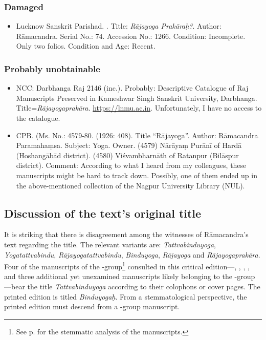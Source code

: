 \subsubsection{Damaged}
\begin{itemize}
\item Lucknow Sanskrit Parishad. . Title: \emph{Rājayoga Prakāraḥ?}. Author: Rāmacandra. Serial No.: 74. Accession No.: 1266. Condition: Incomplete. Only two folios. Condition and Age: Recent. 
\end{itemize}

\subsubsection{Probably unobtainable}
\begin{itemize}  
\item NCC: Darbhanga Raj 2146 (inc.). Probably: Descriptive Catalogue of Raj Manuscripts Preserved in Kameshwar Singh Sanskrit University, Darbhanga. Title=\emph{Rājayogaprakāra}. \url{https://lnmu.ac.in}. Unfortunately, I have no access to the catalogue.
\item CPB. (Ms. No.: 4579-80.  (1926: 408). Title ``Rājayoga''. Author: Rāmacandra Paramahaṃsa. Subject: Yoga. Owner. (4579) Nārāyaṃ Purānī of Hardā (Hoshangābād district). (4580) Viśvambharnāth of Ratanpur (Bilāspur district). Comment: According to what I heard from my colleagues, these manuscripts might be hard to track down. Possibly, one of them ended up in the above-mentioned collection of the Nagpur University Library (NUL). 
\end{itemize}
  
\subsection{Discussion of the text's original title}
\label{titlediscussion}
It is striking that there is disagreement among the witnesses of Rāmacandra's text regarding the title. The relevant variants are: \emph{Tattvabinduyoga}, \emph{Yogatattvabindu}, \emph{Rājayogatattvabindu}, \emph{Binduyoga}, \emph{Rājayoga} and \emph{Rājayogaprakāra}. Four of the manuscripts of the \beta-group\footnote{See p. \pageref{stemma} for the stemmatic analysis of the manuscripts.} consulted in this critical edition—, , , , and three additional yet unexamined manuscripts likely belonging to the \beta-group—bear the title \emph{Tattvabinduyoga} according to their colophons or cover pages. The printed edition  is titled \emph{Binduyogaḥ}. From a stemmatological perspective, the printed edition  must descend from a \beta-group manuscript. 

